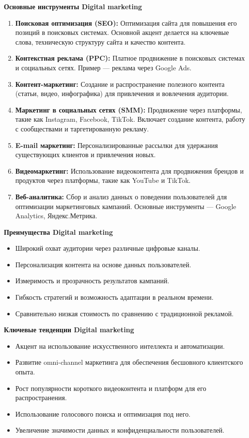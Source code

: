 \textbf{Основные инструменты Digital marketing}
\begin{enumerate}
    \item \textbf{Поисковая оптимизация (SEO):} Оптимизация сайта для повышения его позиций в поисковых системах. Основной акцент делается на ключевые слова, техническую структуру сайта и качество контента.
    \item \textbf{Контекстная реклама (PPC):} Платное продвижение в поисковых системах и социальных сетях. Пример --- реклама через Google Ads.
    \item \textbf{Контент-маркетинг:} Создание и распространение полезного контента (статьи, видео, инфографика) для привлечения и вовлечения аудитории.
    \item \textbf{Маркетинг в социальных сетях (SMM):} Продвижение через платформы, такие как Instagram, Facebook, TikTok. Включает создание контента, работу с сообществами и таргетированную рекламу.
    \item \textbf{E-mail маркетинг:} Персонализированные рассылки для удержания существующих клиентов и привлечения новых.
    \item \textbf{Видеомаркетинг:} Использование видеоконтента для продвижения брендов и продуктов через платформы, такие как YouTube и TikTok.
    \item \textbf{Веб-аналитика:} Сбор и анализ данных о поведении пользователей для оптимизации маркетинговых кампаний. Основные инструменты --- Google Analytics, Яндекс.Метрика.
\end{enumerate}

\textbf{Преимущества Digital marketing}
\begin{itemize}
    \item Широкий охват аудитории через различные цифровые каналы.
    \item Персонализация контента на основе данных пользователей.
    \item Измеримость и прозрачность результатов кампаний.
    \item Гибкость стратегий и возможность адаптации в реальном времени.
    \item Сравнительно низкая стоимость по сравнению с традиционной рекламой.
\end{itemize}

\textbf{Ключевые тенденции Digital marketing}
\begin{itemize}
    \item Акцент на использование искусственного интеллекта и автоматизации.
    \item Развитие omni-channel маркетинга для обеспечения бесшовного клиентского опыта.
    \item Рост популярности короткого видеоконтента и платформ для его распространения.
    \item Использование голосового поиска и оптимизация под него.
    \item Увеличение значимости данных и конфиденциальности пользователей.
\end{itemize}

\pagebreak